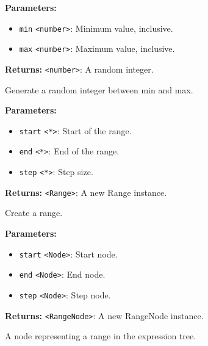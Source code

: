 \documentclass[12pt,a4paper]{article}
\begin{document}
\noindent \textbf{Parameters:}
\begin{itemize}
  \item \texttt{min} \texttt{<number>}: Minimum value, inclusive.
  \item \texttt{max} \texttt{<number>}: Maximum value, inclusive.
\end{itemize}

\noindent \textbf{Returns:} \texttt{<number>}: A random integer.

\noindent Generate a random integer between min and max.

\vspace{5mm}
\noindent {}


\noindent \textbf{Parameters:}
\begin{itemize}
  \item \texttt{start} \texttt{<*>}: Start of the range.
  \item \texttt{end} \texttt{<*>}: End of the range.
  \item \texttt{step} \texttt{<*>}: Step size.
\end{itemize}

\noindent \textbf{Returns:} \texttt{<Range>}: A new Range instance.

\noindent Create a range.

\vspace{5mm}
\noindent {}


\noindent \textbf{Parameters:}
\begin{itemize}
  \item \texttt{start} \texttt{<Node>}: Start node.
  \item \texttt{end} \texttt{<Node>}: End node.
  \item \texttt{step} \texttt{<Node>}: Step node.
\end{itemize}

\noindent \textbf{Returns:} \texttt{<RangeNode>}: A new RangeNode instance.

\noindent A node representing a range in the expression tree.

\vspace{5mm}
\noindent {}
\end{document}
